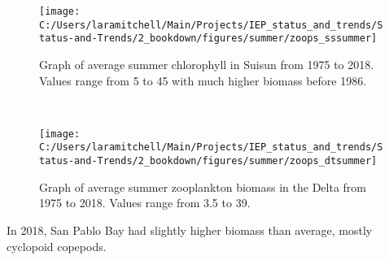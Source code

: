 \documentclass[
]{book}
\begin{document}
\begin{panel-grid}
\begin{columns-nocenter}
\begin{column40}
\end{column40}

\begin{column800}

\begin{expand}

\begin{figure}
\texttt{[image: C:/Users/laramitchell/Main/Projects/IEP\_status\_and\_trends/Status-and-Trends/2\_bookdown/figures/summer/zoops\_sssummer]} \caption{Graph of average summer chlorophyll in Suisun from 1975 to 2018. Values range from 5 to 45 with much higher biomass before 1986.}\label{fig:unnamed-chunk-71}
\end{figure}

\end{expand}

\end{column800}

\begin{column40}

~

\end{column40}

\begin{column800}

\begin{expand}

\begin{figure}
\texttt{[image: C:/Users/laramitchell/Main/Projects/IEP\_status\_and\_trends/Status-and-Trends/2\_bookdown/figures/summer/zoops\_dtsummer]} \caption{Graph of average summer zooplankton biomass in the Delta from 1975 to 2018. Values range from 3.5 to 39.}\label{fig:unnamed-chunk-72}
\end{figure}

\end{expand}

\end{column800}

\end{columns-nocenter}

\begin{columns-nocenter}

\begin{column800}

In 2018, San Pablo Bay had slightly higher biomass than average, mostly cyclopoid copepods.

\end{column800}

\begin{column40}


\end{column40}
\end{columns-nocenter}
\end{panel-grid}
\end{document}
